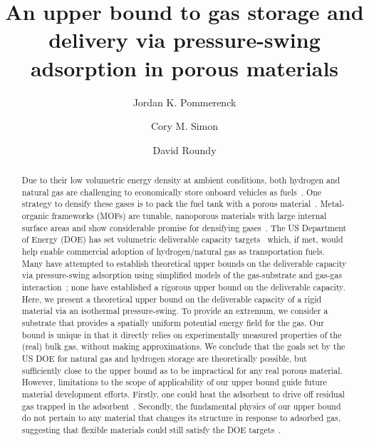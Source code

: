 \documentclass[letterpaper,twocolumn,amsmath,amssymb,nature]{revtex4-2}
\begin{document}
\title{
An upper bound to gas storage and delivery via pressure-swing adsorption in
porous materials}

\author{Jordan K. Pommerenck}
\author{Cory M. Simon}
\author{David Roundy}

\begin{linenomath}
\begin{abstract}
Due to their low volumetric energy density at ambient conditions, both hydrogen
and natural gas are challenging to economically store onboard vehicles as
fuels~\cite{mason2014evaluating, sircar2002pressure}. One strategy to densify
these gases is to pack the fuel tank with a porous
material~\cite{schoedel2016role}. Metal-organic frameworks (MOFs) are tunable,
nanoporous materials with large internal surface areas and show considerable
promise for densifying gases~\cite{makal2012methane,mason2014evaluating,
suh2011hydrogen,garcia2018benchmark, schoedel2016role}. The US Department of
Energy (DOE) has set volumetric deliverable capacity
targets~\cite{simon2015materials, h2targetsDOE} which, if met, would help
enable commercial adoption of hydrogen/natural gas as transportation fuels.
Many have attempted to establish theoretical upper bounds on the deliverable
capacity via pressure-swing adsorption using simplified models of the
gas-substrate and gas-gas interaction~\cite{gomez2014exploring,
gomez2017impact, kaija2018high, lee2019predicting}; none have established a
rigorous upper bound on the deliverable capacity. Here, we present a
theoretical upper bound on the deliverable capacity of a rigid material via an
isothermal pressure-swing. To provide an extremum, we consider a substrate that
provides a spatially uniform potential energy field for the gas. Our bound is
unique in that it directly relies on experimentally measured properties of the
(real) bulk gas, without making approximations. We conclude that the goals set
by the US DOE for natural gas and hydrogen storage are theoretically possible,
but sufficiently close to the upper bound as to be impractical for any real
porous material. However, limitations to the scope of applicability of our
upper bound guide future material development efforts. Firstly, one could heat
the adsorbent to drive off residual gas trapped in the
adsorbent~\cite{gomez2014exploring}. Secondly, the fundamental physics of our
upper bound do not pertain to any material that changes its structure in
response to adsorbed gas, suggesting that flexible materials could still
satisfy the DOE targets~\cite{schneemann2014flexible, choi2008broadly,
mason2015methane}.
\end{abstract}
\end{linenomath}
\end{document}
